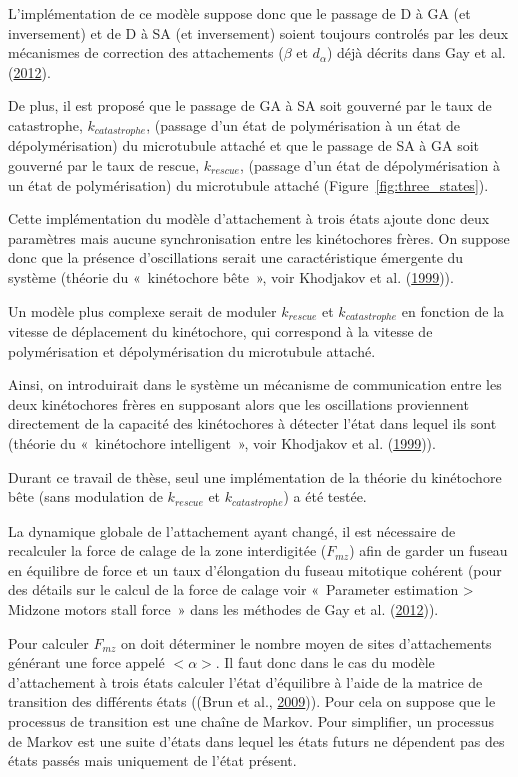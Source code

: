 \documentclass[12pt,a4paper,twoside,openright]{book}
\begin{document}
L'implémentation de ce modèle suppose donc que le passage de D à GA (et
inversement) et de D à SA (et inversement) soient toujours controlés par
les deux mécanismes de correction des attachements (\(\beta\) et
\(d_{\alpha}\)) déjà décrits dans Gay et al.
(\protect\hyperlink{ref-Gay2012a}{2012}).

De plus, il est proposé que le passage de GA à SA soit gouverné par le
taux de catastrophe, \(k_{catastrophe}\), (passage d'un état de
polymérisation à un état de dépolymérisation) du microtubule attaché et
que le passage de SA à GA soit gouverné par le taux de rescue,
\(k_{rescue}\), (passage d'un état de dépolymérisation à un état de
polymérisation) du microtubule attaché (Figure~\ref{fig:three_states}).

Cette implémentation du modèle d'attachement à trois états ajoute donc
deux paramètres mais aucune synchronisation entre les kinétochores
frères. On suppose donc que la présence d'oscillations serait une
caractéristique émergente du système (théorie du «~kinétochore bête~»,
voir Khodjakov et al. (\protect\hyperlink{ref-Khodjakov1999}{1999})).

Un modèle plus complexe serait de moduler \(k_{rescue}\) et
\(k_{catastrophe}\) en fonction de la vitesse de déplacement du
kinétochore, qui correspond à la vitesse de polymérisation et
dépolymérisation du microtubule attaché.

Ainsi, on introduirait dans le système un mécanisme de communication
entre les deux kinétochores frères en supposant alors que les
oscillations proviennent directement de la capacité des kinétochores à
détecter l'état dans lequel ils sont (théorie du «~kinétochore
intelligent~», voir Khodjakov et al.
(\protect\hyperlink{ref-Khodjakov1999}{1999})).

Durant ce travail de thèse, seul une implémentation de la théorie du
kinétochore bête (sans modulation de \(k_{rescue}\) et
\(k_{catastrophe}\)) a été testée.

La dynamique globale de l'attachement ayant changé, il est nécessaire de
recalculer la force de calage de la zone interdigitée (\(F_{mz}\)) afin
de garder un fuseau en équilibre de force et un taux d'élongation du
fuseau mitotique cohérent (pour des détails sur le calcul de la force de
calage voir «~Parameter estimation \textgreater{} Midzone motors stall
force~» dans les méthodes de Gay et al.
(\protect\hyperlink{ref-Gay2012a}{2012})).

Pour calculer \(F_{mz}\) on doit déterminer le nombre moyen de sites
d'attachements générant une force appelé \(<\alpha>\). Il faut donc dans
le cas du modèle d'attachement à trois états calculer l'état d'équilibre
à l'aide de la matrice de transition des différents états ((Brun et al.,
\protect\hyperlink{ref-Brun2009}{2009})). Pour cela on suppose que le
processus de transition est une chaîne de Markov. Pour simplifier, un
processus de Markov est une suite d'états dans lequel les états futurs
ne dépendent pas des états passés mais uniquement de l'état présent.
\end{document}
